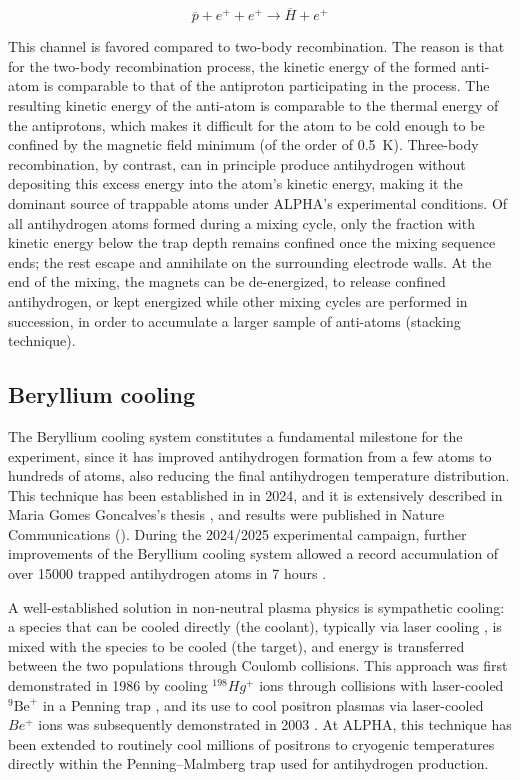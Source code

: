 \begin{equation}
\overline{p} + e^{+} + e^{+} \rightarrow \overline{H} + e^{+}
\end{equation}

This channel is favored compared to two-body recombination. The reason is that for the two-body recombination process, the kinetic energy of the formed anti-atom is comparable to that of the antiproton participating in the process. The resulting kinetic energy of the anti-atom is comparable to the thermal energy of the antiprotons, which makes it difficult for the atom to be cold enough to be confined by the magnetic field minimum (of the order of \SI{0.5}{\kelvin}). Three-body recombination, by contrast, can in principle produce antihydrogen without depositing this excess energy into the atom's kinetic energy, making it the dominant source of trappable atoms under ALPHA's experimental conditions. Of all antihydrogen atoms formed during a mixing cycle, only the fraction with kinetic energy below the trap depth remains confined once the mixing sequence ends; the rest escape and annihilate on the surrounding electrode walls. At the end of the mixing, the magnets can be de-energized, to release confined antihydrogen, or kept energized while other mixing cycles are performed in succession, in order to accumulate a larger sample of anti-atoms (stacking technique).

\subsection{Beryllium cooling}

The Beryllium cooling system constitutes a fundamental milestone for the \ALPHA experiment, since it has improved antihydrogen formation from a few atoms to hundreds of atoms, also reducing the final antihydrogen temperature distribution. This technique has been established in \ALPHA in 2024, and it is extensively described in Maria Gomes Goncalves's thesis \cite{goncalves:2025uuo}, and results were published in Nature Communications (\cite{Baker:2021ink}). During the 2024/2025 experimental campaign, further improvements of the Beryllium cooling system allowed a record accumulation of over 15000 trapped antihydrogen atoms in 7 hours \cite{Akbari:2025mli}.

A well-established solution in non-neutral plasma physics is sympathetic cooling: a species that can be cooled directly (the coolant), typically via laser cooling \cite{Wineland:1978rpc}, is mixed with the species to be cooled (the target), and energy is transferred between the two populations through Coulomb collisions. This approach was first demonstrated in 1986 by cooling $^{198}Hg^{+}$ ions through collisions with laser-cooled $^{9}\text{Be}^{+}$ in a Penning trap \cite{Larson:1986sc}, and its use to cool positron plasmas via laser-cooled $Be^{+}$ ions was subsequently demonstrated in 2003 \cite{Jelenkovic:2003pos}. At ALPHA, this technique has been extended to routinely cool millions of positrons to cryogenic temperatures directly within the Penning--Malmberg trap used for antihydrogen production.

